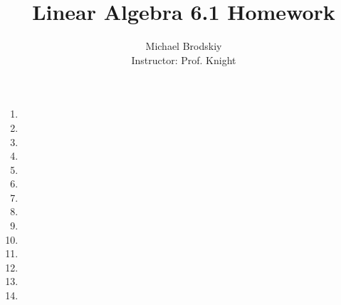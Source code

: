 \documentclass[12pt]{article}
\title{Linear Algebra 6.1 Homework}
\date{}
\author{Michael Brodskiy\\ \small Instructor: Prof. Knight}
\begin{document}
\maketitle

\begin{enumerate}

    \begin{center}
      \underline{1, 6, 11, 13, 16, 19, 21, 23, 25, 29, 33, 36, 37, 39, 45, 48, 55, 56, 57, 58, 63, 65, 69}
    \end{center}

  \item
    
    \setcounter{enumi}{5}

  \item

    \setcounter{enumi}{10}

  \item

    \setcounter{enumi}{12}

  \item

    \setcounter{enumi}{15}

  \item

    \setcounter{enumi}{18}

  \item

    \setcounter{enumi}{20}

  \item

    \setcounter{enumi}{22}

  \item

    \setcounter{enumi}{24}

  \item

    \setcounter{enumi}{28}

  \item

    \setcounter{enumi}{32}

  \item

    \setcounter{enumi}{35}

  \item

  \item

    \setcounter{enumi}{38}

  \item


\end{enumerate}
\end{document}
